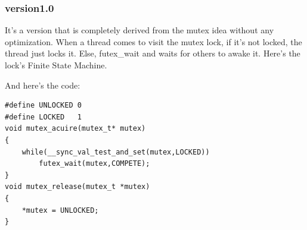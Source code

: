 \documentclass{article}
\begin{document}
		\subsubsection{\textbf{version1.0}}
		It's a version that is completely derived from the mutex idea without any optimization. When a thread comes to visit the mutex lock, if it's not locked, the thread just locks it. Else, futex\_wait and waits for others to awake it. Here's the lock's Finite State Machine. \\
		\begin{center}
		\end{center}
		And here's the code: \\
		\begin{lstlisting}
#define UNLOCKED 0
#define LOCKED   1
void mutex_acuire(mutex_t* mutex)
{
	while(__sync_val_test_and_set(mutex,LOCKED))
		futex_wait(mutex,COMPETE);
}
void mutex_release(mutex_t *mutex)
{
	*mutex = UNLOCKED;
}
		\end{lstlisting}
\end{document}

